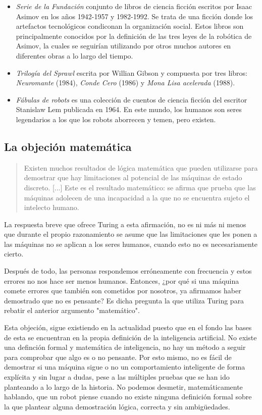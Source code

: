 \documentclass[12pt,a4paper]{article}
\begin{document}
\begin{itemize}
\item \emph{Serie de la Fundación}\cite{Asimov} conjunto de libros de ciencia ficción escritos por Isaac Asimov en los años 1942-1957 y 1982-1992. Se trata de una ficción donde los artefactos tecnológicos condiconan la organización social. Estos libros son principalmente conocidos por la definición de las tres leyes de la robótica de Asimov, la cuales se seguirían utilizando por otros muchos autores en diferentes obras a lo largo del tiempo.
\item \emph{Trilogía del Sprawl}\cite{Sprawl} escrita por Willian Gibson y compuesta por tres libros: \emph{Neuromante} (1984),\emph{ Conde Cero} (1986) y \emph{Mona Lisa acelerada} (1988).
\item \emph{Fábulas de robots}\cite{Robots} es una colección de cuentos de ciencia ficción del escritor Stanislaw Lem publicada en 1964. En este mundo, los humanos son seres legendarios a los que los robots aborrecen y temen, pero existen.
\end{itemize}

\subsection{La objeción matemática}
\begin{quote}\small Existen muchos resultados de lógica matemática que pueden utilizarse para demostrar que hay limitaciones al potencial de las máquinas de estado discreto. [...] Este es el resultado matemático: se afirma que prueba que las máquinas adolecen de una incapacidad a la que no se encuentra sujeto el intelecto humano.\end{quote}

La respuesta breve que ofrece Turing a esta afirmación, no es ni más ni menos que durante el propio razonamiento se asume que las limitaciones que les ponen a las máquinas no se aplican a los seres humanos, cuando esto no es necesariamente cierto.

Después de todo, las personas respondemos erróneamente con frecuencia y estos errores no nos hace ser menos humanos. Entonces, ¿por qué si una máquina comete errores que también son cometidos por nosotros, ya afirmamos haber demostrado que no es pensante? Es dicha pregunta la que utiliza Turing para rebatir el anterior argumento "matemático".

Esta objeción, sigue existiendo en la actualidad puesto que en el fondo las bases de esta se encuentran en la propia definición de la inteligencia artificial. No existe una definción formal y matemática de inteligencia, no hay un método a seguir para comprobar que algo es o no pensante. Por esto mismo, no es fácil de demostrar si una máquina sigue o no un comportamiento inteligente de forma explícita y sin lugar a dudas, pese a las múltiples pruebas que se han ido planteando a lo largo de la historia. No podemos desmetir, matemáticamente hablando, que un robot piense cuando no existe ninguna definición formal sobre la que plantear alguna demostración lógica, correcta y sin ambigüedades.
\end{document}
